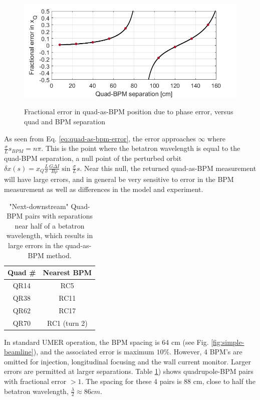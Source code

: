 \begin{figure}
\begin{center}
\includegraphics[width=\textwidth]{6.figures/quad_as_BPM_error.png}
\end{center}
\renewcommand{\baselinestretch}{1}
\small\normalsize
\begin{quote}
\caption[]{Fractional error in quad-as-BPM position due to phase error, versus quad and BPM separation}
\label{fig:quad-as-bpm-error}
\end{quote}
\end{figure} 
\renewcommand{\baselinestretch}{2}
\small\normalsize


As seen from Eq. \ref{eq:quad-as-bpm-error}, the error approaches $\infty$ where $\frac{\sigma}{L}s_{BPM} = n\pi$. This is the point where the betatron wavelength is equal to the quad-BPM separation, a null point of the perturbed orbit $\delta x(s) = x_Q \frac{L}{\sigma} \frac{G \Delta I}{B\rho} \sin{\frac{\sigma}{L}s}$. Near this null, the returned quad-as-BPM measurement will have large errors, and in general be very sensitive to error in the BPM measurement as well as differences in the model and experiment. 


\begin{table}
\centering
\caption{"Next-downstream" Quad-BPM pairs with separations near half of a betatron wavelength, which results in large errors in the quad-as-BPM method.}
\label{tab:nulls}
\begin{tabular}{|c|c|}
Quad \# & Nearest BPM  \\
\hline
QR14 & RC5  \\
QR38 & RC11  \\
QR62 & RC17  \\
QR70 & RC1 (turn 2)  \\
\end{tabular}
\end{table}


In standard UMER operation, the BPM spacing is 64 cm (see Fig. \ref{fig:simple-beamline}), and the associated error is maximum $10\%$. However, 4 BPM's are omitted for injection, longitudinal focusing and the wall current monitor. Larger errors are permitted at larger separations. 
Table \ref{tab:nulls}) shows quadrupole-BPM pairs with fractional error $>1$. The spacing for these 4 pairs is 88 cm, close to half the betatron wavelength, $\frac{\lambda}{2} \approx 86 cm$. 


